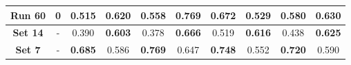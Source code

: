 \begin{table}[!ht]
\begin{tabular}{|c|c|cc|cc|cc|cc|}
		\textbf{Run 60} & 0 & \textbf{0.515} & 0.620 & \textbf{0.558} & \textbf{0.769} & 0.672 & 0.529 & \textbf{0.580} & 0.630 \\
		
		\hline
		
		\textbf{Set 14} & - & 0.390 & \textbf{0.603} & 0.378 & \textbf{0.666} & 0.519 & \textbf{0.616} & 0.438 & \textbf{0.625} \\
		
		\hline
		\hline
		
		\textbf{Set 7} & - & \textbf{0.685} & 0.586 & \textbf{0.769} & 0.647 & \textbf{0.748} & 0.552 & \textbf{0.720} & 0.590 \\
		
		\hline
		
	\end{tabular}
	\label{tab:Experiment2PED}
\end{table}

